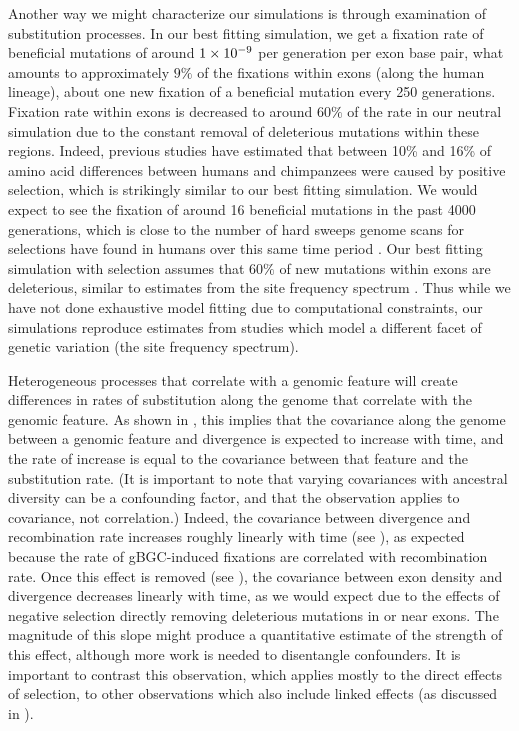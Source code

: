 Another way we might characterize our simulations is 
through examination of substitution processes.
In our best fitting simulation, 
we get a fixation rate of beneficial mutations of around ${1}\times10^{-9}$ per generation per exon base pair,
what amounts to approximately $9\%$ of the fixations within exons (along the human lineage),
\ie about one new fixation of a beneficial mutation every 250 generations.
Fixation rate within exons is decreased to around $60\%$ of the rate in our neutral simulation due to the constant removal of deleterious mutations within these regions.
Indeed, previous studies \citep{boyko_assessing_2008, zhen_greater_2021-1, laval_sporadic_2021} have estimated that between 10\% and 16\% of amino acid differences between humans and chimpanzees were caused by positive selection,
which is strikingly similar to our best fitting simulation.
We would expect to see the fixation of around 16 beneficial mutations in the past 4000 generations,
which is close to the number of hard sweeps genome scans for selections have found in humans over this same time period \citep{schrider_soft_2017, schrider_shic_2016}.
Our best fitting simulation with selection assumes that $60\%$ of new mutations within exons are deleterious,
similar to estimates from the site frequency spectrum \citep{boyko_assessing_2008,kim_inference_2017, huber_determining_2017}.
Thus while we have not done exhaustive model fitting due to computational constraints,
our simulations reproduce estimates from studies which model a different facet of genetic variation (\ie the site frequency spectrum).

Heterogeneous processes that correlate with a genomic feature
will create differences in rates of substitution along the genome
that correlate with the genomic feature.
As shown in , this implies that 
the covariance along the genome between a genomic feature and divergence
is expected to increase with time,
and the rate of increase is
equal to the covariance between that feature and the substitution rate.
(It is important to note that
varying covariances with ancestral diversity can be a confounding factor,
and that the observation applies to covariance, not correlation.)
Indeed,
the covariance between divergence and recombination rate increases roughly linearly with time
(see ),
as expected because the rate of gBGC-induced fixations are correlated with recombination rate.
Once this effect is removed (see ),
the covariance between exon density and divergence decreases linearly with time,
as we would expect due to the effects of negative selection directly removing deleterious mutations
in or near exons.
The magnitude of this slope might produce a quantitative estimate
of the strength of this effect,
although more work is needed to disentangle confounders.
It is important to contrast this observation,
which applies mostly to the direct effects of selection,
to other observations which also include linked effects
(as discussed in \cite{phung_determining_2016}).

